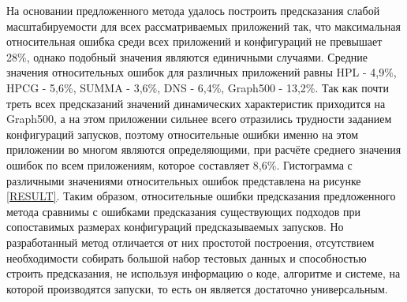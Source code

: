	На основании предложенного метода удалось построить предсказания слабой масштабируемости для всех рассматриваемых приложений так, что максимальная относительная ошибка среди всех приложений и конфигураций не превышает 28\%, однако подобный значения являются единичными случаями. Средние значения относительных ошибок для различных приложений равны HPL - 4,9\%, HPCG - 5,6\%, SUMMA - 3,6\%, DNS - 6,4\%, Graph500 - 13,2\%. Так как почти треть всех предсказаний значений динамических характеристик приходится на Graph500, а на этом приложении сильнее всего отразились трудности заданием конфигураций запусков, поэтому  относительные ошибки именно на этом приложении во многом являются определяющими, при расчёте среднего значения ошибок по всем приложениям, которое составляет 8,6\%. Гистограмма с различными значениями относительных ошибок представлена на рисунке \eqref{RESULT}. Таким образом, относительные ошибки предсказания предложенного метода
	сравнимы с ошибками предсказания существующих подходов при сопоставимых размерах конфигураций предсказываемых запусков. Но разработанный метод отличается от них простотой построения, отсутствием необходимости собирать большой набор тестовых данных и способностью строить предсказания, не используя информацию о коде, алгоритме и системе, на которой производятся запуски, то есть он является достаточно универсальным.
	
\clearpage
